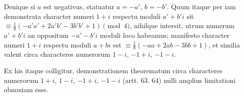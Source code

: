 Denique si $a$ est negativus, statuatur $a=-a'$, $b=-b'$. Quum itaque per iam demonstrata character numeri $1+i$ respectu moduli $a'+b'i$ sit $\equiv\frac18(-a'a'+2a'b'-3b'b'+1)\pmod4$, nihilque intersit, utrum numerum $a'+b'i$ an oppositum $-a'-b'i$ moduli loco habeamus; manifesto character numeri $1+i$ respectu moduli $a+bi$ est $\equiv\frac18(-aa+2ab-3bb+1)$, et similia valent circa characteres numerorum $1-i$, $-1+i$, $-1-i$. 

Ex his itaque colligitur, demonstrationem theorematum circa characteres numerorum $1+i$, $1-i$, $-1+i$, $-1-i$ (artt. 63. 64) nulli amplius limitationi obnoxiam esse.

\clearpage{}%
\thispagestyle{empty}
\begin{center}
\vspace*{1in}{\Large ANZEIGEN\par}
\vspace{.4in}{\large EIGNER\par}
\vspace{.4in}{\Large SCHRIFTEN.\par}
\end{center}

